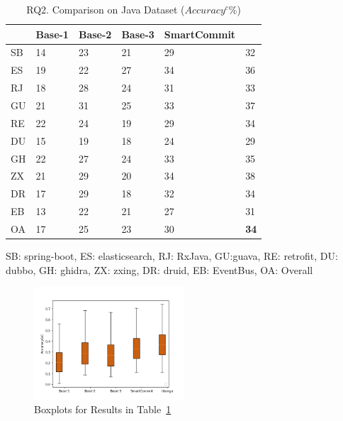 	

\begin{table}[t]
	\caption{RQ2. Comparison on Java Dataset ($Accuracy^c$\%)}
	\vspace{-12pt}
	\begin{center}
		\small
		\tabcolsep 4pt
		\renewcommand{\arraystretch}{1} \begin{tabular}{p{0.5cm}<{\centering}|p{1.2cm}<{\centering}|p{1.2cm}<{\centering}|p{1.2cm}<{\centering}|p{1.2cm}<{\centering}|p{1.2cm}<{\centering}}
			
			\hline
			          & Base-1 & Base-2  & Base-3 & SmartCommit & \bf {\tool}\\
			\hline
			SB   & 14 & 23 & 21 & 29 & 32\\
			ES   & 19 & 22 & 27 & 34 & 36\\
			RJ   & 18 & 28 & 24 & 31 & 33\\
			GU   & 21 & 31 & 25 & 33 & 37\\
			RE   & 22 & 24 & 19 & 29 & 34\\
			DU   & 15 & 19 & 18 & 24 & 29\\
			GH   & 22 & 27 & 24 & 33 & 35\\
			ZX   & 21 & 29 & 20 & 34 & 38\\
			DR   & 17 & 29 & 18 & 32 & 34\\
			EB   & 13 & 22 & 21 & 27 & 31\\
			\hline
			OA   &  17  & 25 &  23 & 30 & {\bf 34} \\
			\hline
		\end{tabular}
		\label{RQ2-result-1}
	SB: spring-boot, ES: elasticsearch, RJ: RxJava, GU:guava, RE: retrofit, DU: dubbo, GH: ghidra, ZX: zxing, DR: druid, EB: EventBus, OA: Overall
	\end{center}
\end{table}

\begin{figure}[t]
	\centering \includegraphics[width=2.2in]{figures/RQ_2_1.png}
	\vspace{-6pt}
	\caption{Boxplots for Results in Table~\ref{RQ2-result-1}}
	\label{RQ2-result-2}
\end{figure}

